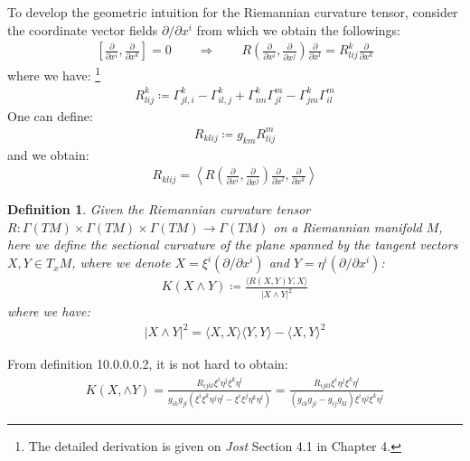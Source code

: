 \documentclass[11pt]{book}
\theoremstyle{break}
\theoremstyle{break}
\newtheorem{defn}{Definition}[corL]
\newcommand{\pd}{\partial}
\begin{document}
To develop the geometric intuition for the Riemannian curvature tensor, consider the coordinate vector fields $\pd /\pd x^i$ from which we obtain the followings:
\begin{align*}
\left[\frac{\pd}{\pd x^i}, \frac{\pd}{\pd x^k} \right] = 0
\qquad \Rightarrow\qquad 
R\left( \frac{\pd}{\pd x^i}, \frac{\pd}{\pd x^j}\right) \frac{\pd}{\pd x^l} = R^k_{lij}\frac{\pd}{\pd x^k}
\end{align*}
where we have: \footnote{The detailed derivation is given on \textit{Jost} Section 4.1 in Chapter 4.}
\begin{align*}
R_{lij}^k \coloneqq \Gamma_{jl,i}^k - \Gamma_{il,j}^k + \Gamma_{im}^k\Gamma_{jl}^m - \Gamma_{jm}^k\Gamma_{il}^m
\end{align*}
One can define:
\begin{align*}
R_{klij}  \coloneqq g_{km}R^{m}_{lij}
\end{align*}
and we obtain:
\begin{align}
R_{klij} = \left\langle R \left( \frac{\pd}{\pd x^i}, \frac{\pd}{\pd x^j}\right) \frac{\pd}{\pd x^l}
, \frac{\pd}{\pd x^k}\right\rangle
\end{align}

\begin{defn}
Given the Riemannian curvature tensor $R:\Gamma(TM) \times \Gamma(TM) \times \Gamma(TM) \to \Gamma(TM)$ on a Riemannian manifold $M$, here we define the sectional curvature of the plane spanned by the tangent vectors $X,Y \in T_xM$, where we denote $X = \xi^i(\pd/\pd x^i) $ and $Y = \eta^i (\pd /\pd x^i)$:
\begin{align*}
K(X\wedge Y) \coloneqq \frac{\langle R(X,Y)Y, X\rangle }{|X\wedge Y|^2}
\end{align*}
where we have:
\begin{align*}
|X \wedge Y |^2 = \langle X,X\rangle \langle Y,Y\rangle  - \langle X,Y\rangle^2
\end{align*}
\end{defn}
From definition 10.0.0.0.2, it is not hard to obtain:
\begin{align*}
K(X,\wedge Y) = \frac{R_{ijkl}\xi^i \eta^j \xi^k \eta^l}{g_{ik}g_{jl}(\xi^i\xi^k \eta^j\eta^l - \xi^i\xi^j \eta^k \eta^l)} = \frac{R_{ijkl}\xi^i \eta^j \xi^k \eta^l}{(g_{ik}g_{jl} - g_{ij}g_{kl})\xi^i \eta^j \xi^k\eta^l}
\end{align*}
\end{document}
